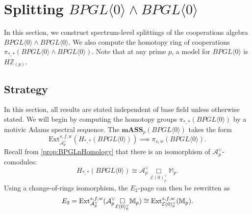 \documentclass{amsart}
\theoremstyle{plain}
\numberwithin{theorem}{section}
\numberwithin{equation}{section}
\numberwithin{figure}{section}
\newcommand{\0}{\langle 0 \rangle }
\begin{document}
\section{Splitting $BPGL \langle 0 \rangle \wedge BPGL \langle 0 \rangle$}
\label{sec:BPGL0}
In this section, we construct spectrum-level splittings of the cooperations algebra $BPGL \langle 0\rangle \wedge BPGL \langle 0 \rangle$. We also compute the homotopy ring of cooperations $\pi_{*,*}(BPGL \langle 0 \rangle \wedge BPGL \langle 0 \rangle)$. Note that at any prime $p$, a model for $BPGL \langle 0 \rangle$ is $H \mathbb{Z}_{(p)}$. 

\subsection{Strategy}
In this section, all results are stated independent of base field unless otherwise stated. We will begin by computing the homotopy groups $\pi_{*,*}(BPGL \langle 0 \rangle)$ by a motivic Adams spectral sequence. The $\textbf{mASS}_p(BPGL \langle 0 \rangle)$ takes the form
\[\text{Ext}^{s,f,w}_{\mathcal{A}_p^\vee}(H_{*,*}(BPGL \langle 0 \rangle)) \implies \pi_{s,w}(BPGL \langle 0 \rangle).\]
Recall from \cref{prop:BPGLnHomology} that there is an isomorphism of $\mathcal{A}^\vee_p$-comodules:
\[H_{*,*}(BPGL \langle 0 \rangle) \cong \mathcal{A}^\vee_p\underset{\mathcal{E}(0)^\vee_p}{\Box}\mathbb{M}_p.\]
Using a change-of-rings isomorphism, the $E_2$-page can then be rewritten as
\[E_2 = \text{Ext}^{s,f,w}_{\mathcal{A}_p^\vee}(\mathcal{A}^\vee_p\underset{\mathcal{E}(0)^\vee_p}{\Box}\mathbb{M}_p) \cong \textup{Ext}^{s,f,w}_{\mathcal{E}(0)_p^\vee}(\mathbb{M}_p).\]
\end{document}
